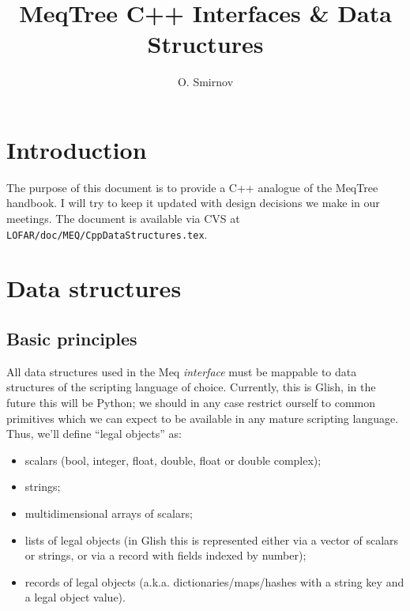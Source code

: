 \documentclass[10pt]{article}
\title{MeqTree C++ Interfaces \& Data Structures}
\author{O. Smirnov}
\begin{document}
\sloppy

\newcommand{\url}[1]{{\tt #1}}

\maketitle

\newcommand{\qq}[1]{{\tt #1}}

\newcommand{\Request}{{\tt Request}}
\newcommand{\RequestId}{{\tt RequestId}}
\newcommand{\Result}{{\tt Result}}
\newcommand{\VellSet}{{\tt VellSet}}
\newcommand{\Cells}{{\tt Cells}}
\newcommand{\Vells}{{\tt Vells}}
\newcommand{\Domain}{{\tt Domain}}
\newcommand{\Node}{{\tt Node}}
\newcommand{\Parm}{{\tt Parm}}
\newcommand{\Polc}{{\tt Polc}}
\newcommand{\RES}[1]{{\tt RES\_#1}}


\section{Introduction}

The purpose of this document is to provide a C++ analogue of the MeqTree
handbook. I will try to keep it updated with design decisions we make in our
meetings. The document is available via CVS at
\qq{LOFAR/doc/MEQ/CppDataStructures.tex}.

\section{Data structures} 

\subsection{Basic principles}

  All data structures used in the Meq {\em interface} must be mappable to data
  structures of the scripting language of choice. Currently, this is Glish, in
  the future this will be Python; we should in any case restrict ourself to
  common primitives which we can expect to be available in any mature scripting
  language. Thus, we'll define ``legal objects'' as:

  \begin{itemize}
  
  \item scalars (bool, integer, float, double, float or double complex);
  
  \item strings;
  
  \item multidimensional arrays of scalars;
  
  \item lists of legal objects (in Glish this is represented either  via a
  vector of scalars or strings, or via a record with fields indexed by number);

  \item records of legal objects (a.k.a. dictionaries/maps/hashes with a string
  key and a legal object value).

  \end{itemize}
\end{document}
